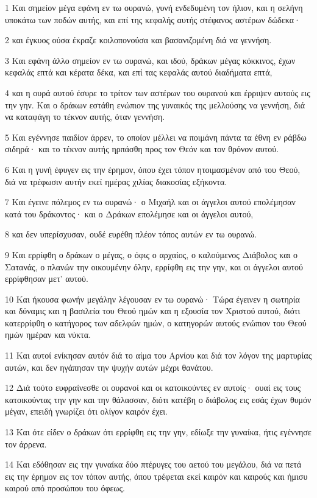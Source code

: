 \par 1 Και σημείον μέγα εφάνη εν τω ουρανώ, γυνή ενδεδυμένη τον ήλιον, και η σελήνη υποκάτω των ποδών αυτής, και επί της κεφαλής αυτής στέφανος αστέρων δώδεκα·
\par 2 και έγκυος ούσα έκραζε κοιλοπονούσα και βασανιζομένη διά να γεννήση.
\par 3 Και εφάνη άλλο σημείον εν τω ουρανώ, και ιδού, δράκων μέγας κόκκινος, έχων κεφαλάς επτά και κέρατα δέκα, και επί τας κεφαλάς αυτού διαδήματα επτά,
\par 4 και η ουρά αυτού έσυρε το τρίτον των αστέρων του ουρανού και έρριψεν αυτούς εις την γην. Και ο δράκων εστάθη ενώπιον της γυναικός της μελλούσης να γεννήση, διά να καταφάγη το τέκνον αυτής, όταν γεννήση.
\par 5 Και εγέννησε παιδίον άρρεν, το οποίον μέλλει να ποιμάνη πάντα τα έθνη εν ράβδω σιδηρά· και το τέκνον αυτής ηρπάσθη προς τον Θεόν και τον θρόνον αυτού.
\par 6 Και η γυνή έφυγεν εις την έρημον, όπου έχει τόπον ητοιμασμένον από του Θεού, διά να τρέφωσιν αυτήν εκεί ημέρας χιλίας διακοσίας εξήκοντα.
\par 7 Και έγεινε πόλεμος εν τω ουρανώ· ο Μιχαήλ και οι άγγελοι αυτού επολέμησαν κατά του δράκοντος· και ο Δράκων επολέμησε και οι άγγελοι αυτού,
\par 8 και δεν υπερίσχυσαν, ουδέ ευρέθη πλέον τόπος αυτών εν τω ουρανώ.
\par 9 Και ερρίφθη ο δράκων ο μέγας, ο όφις ο αρχαίος, ο καλούμενος Διάβολος και ο Σατανάς, ο πλανών την οικουμένην όλην, ερρίφθη εις την γην, και οι άγγελοι αυτού ερρίφθησαν μετ' αυτού.
\par 10 Και ήκουσα φωνήν μεγάλην λέγουσαν εν τω ουρανώ· Τώρα έγεινεν η σωτηρία και δύναμις και η βασιλεία του Θεού ημών και η εξουσία τον Χριστού αυτού, διότι κατερρίφθη ο κατήγορος των αδελφών ημών, ο κατηγορών αυτούς ενώπιον του Θεού ημών ημέραν και νύκτα.
\par 11 Και αυτοί ενίκησαν αυτόν διά το αίμα του Αρνίου και διά τον λόγον της μαρτυρίας αυτών, και δεν ηγάπησαν την ψυχήν αυτών μέχρι θανάτου.
\par 12 Διά τούτο ευφραίνεσθε οι ουρανοί και οι κατοικούντες εν αυτοίς· ουαί εις τους κατοικούντας την γην και την θάλασσαν, διότι κατέβη ο διάβολος εις εσάς έχων θυμόν μέγαν, επειδή γνωρίζει ότι ολίγον καιρόν έχει.
\par 13 Και ότε είδεν ο δράκων ότι ερρίφθη εις την γην, εδίωξε την γυναίκα, ήτις εγέννησε τον άρρενα.
\par 14 Και εδόθησαν εις την γυναίκα δύο πτέρυγες του αετού του μεγάλου, διά να πετά εις την έρημον εις τον τόπον αυτής, όπου τρέφεται εκεί καιρόν και καιρούς και ήμισυ καιρού από προσώπου του όφεως.
